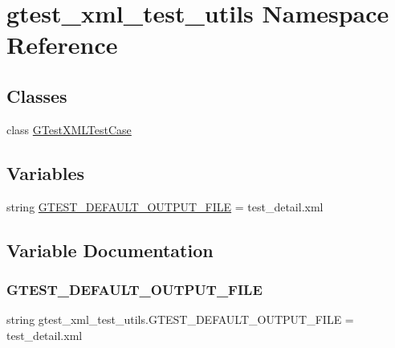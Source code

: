 \hypertarget{namespacegtest__xml__test__utils}{}\section{gtest\+\_\+xml\+\_\+test\+\_\+utils Namespace Reference}
\label{namespacegtest__xml__test__utils}
\subsection*{Classes}
\begin{DoxyCompactItemize}
\item 
class \mbox{\hyperlink{classgtest__xml__test__utils_1_1GTestXMLTestCase}{G\+Test\+X\+M\+L\+Test\+Case}}
\end{DoxyCompactItemize}
\subsection*{Variables}
\begin{DoxyCompactItemize}
\item 
string \mbox{\hyperlink{namespacegtest__xml__test__utils_aebe969ed368778716d0619214ff7b853}{G\+T\+E\+S\+T\+\_\+\+D\+E\+F\+A\+U\+L\+T\+\_\+\+O\+U\+T\+P\+U\+T\+\_\+\+F\+I\+LE}} = \textquotesingle{}test\+\_\+detail.\+xml\textquotesingle{}
\end{DoxyCompactItemize}


\subsection{Variable Documentation}
\mbox{\label{namespacegtest__xml__test__utils_aebe969ed368778716d0619214ff7b853}} 
\subsubsection{\texorpdfstring{GTEST\_DEFAULT\_OUTPUT\_FILE}{GTEST\_DEFAULT\_OUTPUT\_FILE}}
{\footnotesize\ttfamily string gtest\+\_\+xml\+\_\+test\+\_\+utils.\+G\+T\+E\+S\+T\+\_\+\+D\+E\+F\+A\+U\+L\+T\+\_\+\+O\+U\+T\+P\+U\+T\+\_\+\+F\+I\+LE = \textquotesingle{}test\+\_\+detail.\+xml\textquotesingle{}}

